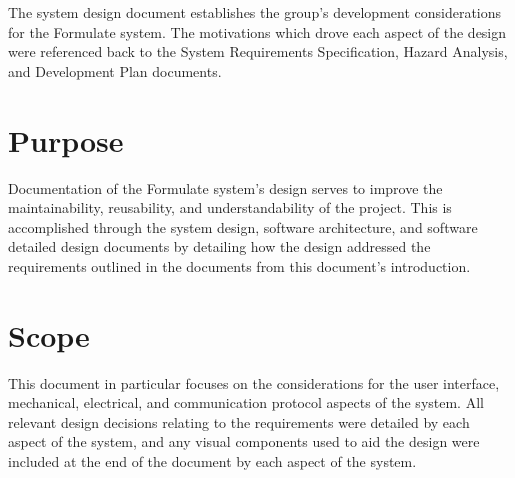 \documentclass[12pt, titlepage]{article}
\begin{document}
The system design document establishes the group's development considerations for the Formulate system. The motivations which drove each aspect of the design were referenced back to the System Requirements Specification, Hazard Analysis, and Development Plan documents. 


\section{Purpose}



Documentation of the Formulate system's design serves to improve the maintainability, reusability, and understandability of the project. This is accomplished through the system design, software architecture, and software detailed design documents by detailing how the design addressed the requirements outlined in the documents from this document's introduction. \\

\section{Scope}


This document in particular focuses on the considerations for the user interface, mechanical, electrical, and communication protocol aspects of the system. All relevant design decisions relating to the requirements were detailed by each aspect of the system, and any visual components used to aid the design were included at the end of the document by each aspect of the system. \\ 
\end{document}
